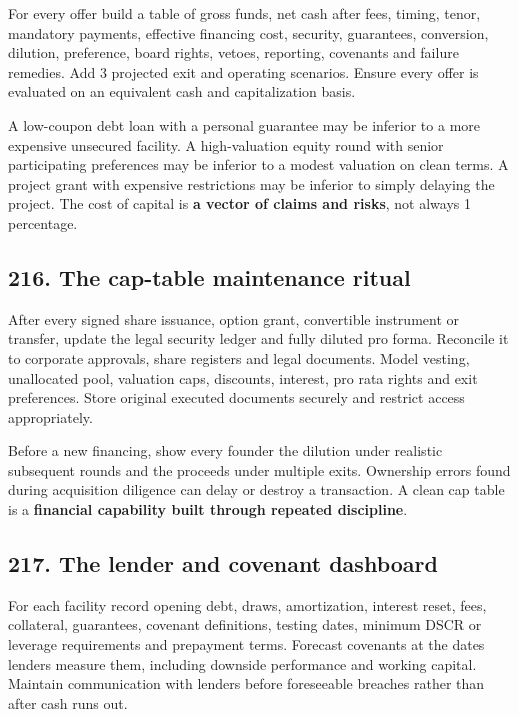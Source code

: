 For every offer build a table of gross funds, net cash after fees, timing, tenor, mandatory payments, effective financing cost, security, guarantees, conversion, dilution, preference, board rights, vetoes, reporting, covenants and failure remedies. Add 3 projected exit and operating scenarios. Ensure every offer is evaluated on an equivalent cash and capitalization basis.

A low-coupon debt loan with a personal guarantee may be inferior to a more expensive unsecured facility. A high-valuation equity round with senior participating preferences may be inferior to a modest valuation on clean terms. A project grant with expensive restrictions may be inferior to simply delaying the project. The cost of capital is \textbf{a vector of claims and risks}, not always 1 percentage.

\subsection{216. The cap-table maintenance ritual}


After every signed share issuance, option grant, convertible instrument or transfer, update the legal security ledger and fully diluted pro forma. Reconcile it to corporate approvals, share registers and legal documents. Model vesting, unallocated pool, valuation caps, discounts, interest, pro rata rights and exit preferences. Store original executed documents securely and restrict access appropriately.

Before a new financing, show every founder the dilution under realistic subsequent rounds and the proceeds under multiple exits. Ownership errors found during acquisition diligence can delay or destroy a transaction. A clean cap table is a \textbf{financial capability built through repeated discipline}.

\subsection{217. The lender and covenant dashboard}


For each facility record opening debt, draws, amortization, interest reset, fees, collateral, guarantees, covenant definitions, testing dates, minimum DSCR or leverage requirements and prepayment terms. Forecast covenants at the dates lenders measure them, including downside performance and working capital. Maintain communication with lenders before foreseeable breaches rather than after cash runs out.

